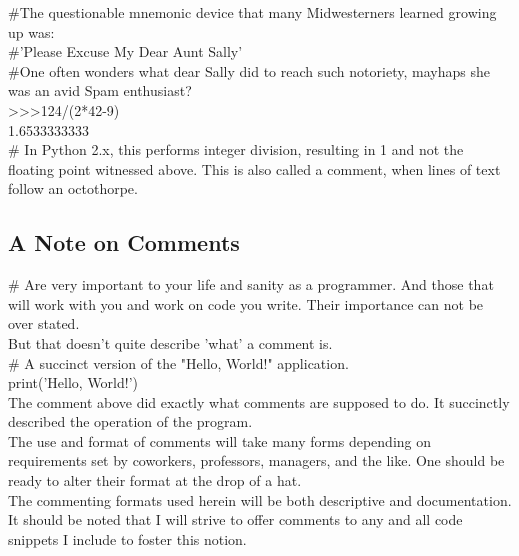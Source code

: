 \documentclass[oneside,12pt]{memoir} %
\begin{document}
\#The questionable mnemonic device that many Midwesterners learned growing up was:\\
\#'Please Excuse My Dear Aunt Sally'\\
\#One often wonders what dear Sally did to reach such notoriety, mayhaps she was an avid Spam enthusiast?\\
{>}{>}{>}124/(2*42-9)\\
1.6533333333\\
\# In Python 2.x, this performs integer division, resulting in 1 and not the floating point witnessed above. This is also called a comment, when lines of text follow an octothorpe. \\



\subsection {A Note on Comments}
\label{sub:a_note_on_comments}

\# Are very important to your life and sanity as a programmer. And those that will work with you and work on code you write. Their importance can not be over stated.\\
But that doesn't quite describe 'what' a comment is. \\
\# A succinct version of the "Hello, World!" application.\\
print('Hello, World!') \\
The comment above did exactly what comments are supposed to do. It succinctly described the operation of the program.\\
The use and format of comments will take many forms depending on requirements set by coworkers, professors, managers, and the like. One should be ready to alter their format at the drop of a hat.\\
The commenting formats used herein will be both descriptive and documentation. \\
 It should be noted that I will strive to offer comments to any and all code snippets I include to foster this notion. \\





\end{document}
